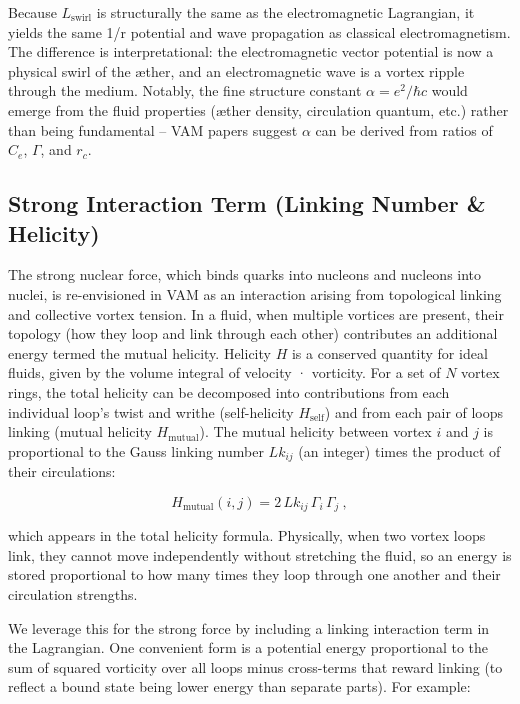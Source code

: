 \documentclass[a4paper,12pt]{article}
\begin{document}
        
        Because $L_{\text{swirl}}$ is structurally the same as the electromagnetic Lagrangian, it yields the same 1/r potential and wave propagation as classical electromagnetism. The difference is interpretational: the electromagnetic vector potential is now a physical swirl of the æther, and an electromagnetic wave is a vortex ripple through the medium. Notably, the fine structure constant $\alpha = e^2/\hbar c$ would emerge from the fluid properties (æther density, circulation quantum, etc.) rather than being fundamental – VAM papers suggest $\alpha$ can be derived from ratios of $C_e$, $\Gamma$, and $r_c$.
        
        
        \subsection{Strong Interaction Term (Linking Number \& Helicity)}
        
        The strong nuclear force, which binds quarks into nucleons and nucleons into nuclei, is re-envisioned in VAM as an interaction arising from topological linking and collective vortex tension. In a fluid, when multiple vortices are present, their topology (how they loop and link through each other) contributes an additional energy termed the mutual helicity. Helicity $H$ is a conserved quantity for ideal fluids, given by the volume integral of velocity · vorticity. For a set of $N$ vortex rings, the total helicity can be decomposed into contributions from each individual loop’s twist and writhe (self-helicity $H_{\text{self}}$) and from each pair of loops linking (mutual helicity $H_{\text{mutual}}$). The mutual helicity between vortex $i$ and $j$ is proportional to the Gauss linking number $Lk_{ij}$ (an integer) times the product of their circulations:
        
        
        \[
        H_{\text{mutual}}(i,j) = 2\,Lk_{ij}\,\Gamma_i\,\Gamma_j ~,
        \]
        
        which appears in the total helicity formula. Physically, when two vortex loops link, they cannot move independently without stretching the fluid, so an energy is stored proportional to how many times they loop through one another and their circulation strengths.
        
        
        We leverage this for the strong force by including a linking interaction term in the Lagrangian. One convenient form is a potential energy proportional to the sum of squared vorticity over all loops minus cross-terms that reward linking (to reflect a bound state being lower energy than separate parts). For example:
        
\end{document}
